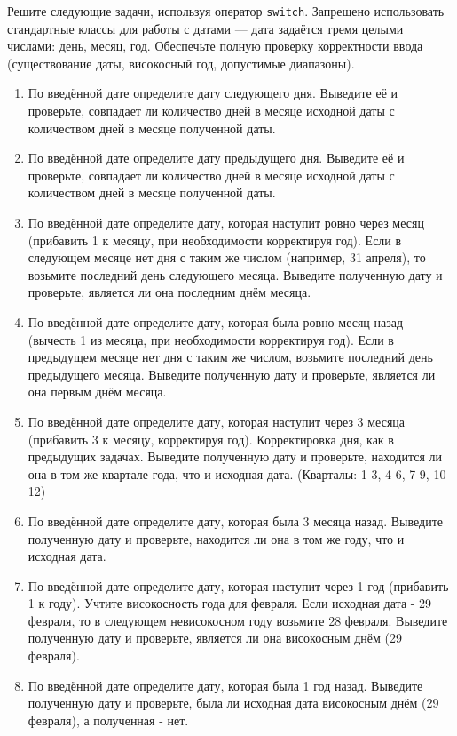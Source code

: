 \documentclass[12pt]{article}
\begin{document}
Решите следующие задачи, используя оператор \texttt{switch}. Запрещено использовать стандартные классы для работы с датами — дата задаётся тремя целыми числами: день, месяц, год. Обеспечьте полную проверку корректности ввода (существование даты, високосный год, допустимые диапазоны).

\begin{enumerate}
    \item По введённой дате определите дату следующего дня. Выведите её и проверьте, совпадает ли количество дней в месяце исходной даты с количеством дней в месяце полученной даты.
    \item По введённой дате определите дату предыдущего дня. Выведите её и проверьте, совпадает ли количество дней в месяце исходной даты с количеством дней в месяце полученной даты.
    \item По введённой дате определите дату, которая наступит ровно через месяц (прибавить 1 к месяцу, при необходимости корректируя год). Если в следующем месяце нет дня с таким же числом (например, 31 апреля), то возьмите последний день следующего месяца. Выведите полученную дату и проверьте, является ли она последним днём месяца.
    \item По введённой дате определите дату, которая была ровно месяц назад (вычесть 1 из месяца, при необходимости корректируя год). Если в предыдущем месяце нет дня с таким же числом, возьмите последний день предыдущего месяца. Выведите полученную дату и проверьте, является ли она первым днём месяца.
    \item По введённой дате определите дату, которая наступит через 3 месяца (прибавить 3 к месяцу, корректируя год). Корректировка дня, как в предыдущих задачах. Выведите полученную дату и проверьте, находится ли она в том же квартале года, что и исходная дата. (Кварталы: 1-3, 4-6, 7-9, 10-12)
    \item По введённой дате определите дату, которая была 3 месяца назад. Выведите полученную дату и проверьте, находится ли она в том же году, что и исходная дата.
    \item По введённой дате определите дату, которая наступит через 1 год (прибавить 1 к году). Учтите високосность года для февраля. Если исходная дата - 29 февраля, то в следующем невисокосном году возьмите 28 февраля. Выведите полученную дату и проверьте, является ли она високосным днём (29 февраля).
    \item По введённой дате определите дату, которая была 1 год назад. Выведите полученную дату и проверьте, была ли исходная дата високосным днём (29 февраля), а полученная - нет.

\end{enumerate}
\end{document}
